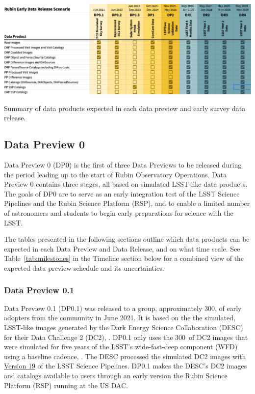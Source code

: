 \begin{table}[ht]
\centering
\includegraphics[width=\linewidth]{figures/DPR-summary}
\caption{Summary of data products expected in each data preview and early survey data release.}
\label{tab:data-preview-summary}
\end{table}

\subsection{Data Preview 0}
\label{sec:dp0}

Data Preview 0 (DP0) is the first of three Data Previews to be released during the period leading up to the start of Rubin Observatory Operations. 
Data Preview 0 contains three stages, all based on simulated LSST-like data products. 
The goals of DP0 are to serve as an early integration test of the LSST Science Pipelines and the Rubin Science Platform (RSP), and to enable a limited number of astronomers and students to begin early preparations for science with the LSST.

The tables presented in the following  sections outline which data products can be expected in each Data Preview and Data Release, and on what time scale.
See Table~\ref{tab:milestones} in the Timeline section below for a combined view of the expected data preview schedule and its uncertainties.

\subsubsection{Data Preview 0.1}
\label{sec:dp01}

Data Preview 0.1 (DP0.1) was released to a group, approximately 300,  of early adopters from the community in June 2021. 
It is based on the the simulated, LSST-like images generated by the Dark Energy Science Collaboration (DESC) for their Data Challenge 2 (DC2), \citep{2021ApJS..253...31L}. 
DP0.1 only uses the 300~\sqdeg of DC2 images that were simulated for five years of the LSST’s wide-fast-deep component (WFD) using a baseline cadence, .
The DESC processed the simulated DC2 images with \href{https://pipelines.lsst.io/v/v19_0_0/index.html}{Version 19} of the LSST Science Pipelines. 
DP0.1 makes the DESC’s DC2 images and catalogs available to users through an early version the Rubin Science Platform (RSP) running at the US DAC. 

